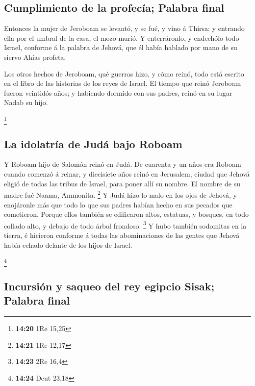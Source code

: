 \hypertarget{cumplimiento-de-la-profecuxeda-palabra-final}{%
\subsection{Cumplimiento de la profecía; Palabra
final}\label{cumplimiento-de-la-profecuxeda-palabra-final}}

 Entonces la mujer de Jeroboam se levantó, y se fué, y vino
á Thirsa: y entrando ella por el umbral de la casa, el mozo murió.
 Y enterráronlo, y endechólo todo Israel, conforme á la
palabra de Jehová, que él había hablado por mano de su siervo Ahías
profeta.

 Los otros hechos de Jeroboam, qué guerras hizo, y cómo
reinó, todo está escrito en el libro de las historias de los reyes de
Israel.  El tiempo que reinó Jeroboam fueron veintidós
años; y habiendo dormido con sus padres, reinó en su lugar Nadab su
hijo.

\footnote{\textbf{14:20} 1Re 15,25}

\hypertarget{la-idolatruxeda-de-juduxe1-bajo-roboam}{%
\subsection{La idolatría de Judá bajo
Roboam}\label{la-idolatruxeda-de-juduxe1-bajo-roboam}}

 Y Roboam hijo de Salomón reinó en Judá. De cuarenta y un
años era Roboam cuando comenzó á reinar, y diecisiete años reinó en
Jerusalem, ciudad que Jehová eligió de todas las tribus de Israel, para
poner allí su nombre. El nombre de su madre fué Naama, Ammonita.
\footnote{\textbf{14:21} 1Re 12,17}  Y Judá hizo lo malo en
los ojos de Jehová, y enojáronle más que todo lo que sus padres habían
hecho en sus pecados que cometieron.  Porque ellos también
se edificaron altos, estatuas, y bosques, en todo collado alto, y debajo
de todo árbol frondoso: \footnote{\textbf{14:23} 2Re 16,4} 
Y hubo también sodomitas en la tierra, é hicieron conforme á todas las
abominaciones de las gentes que Jehová había echado delante de los hijos
de Israel.

\footnote{\textbf{14:24} Deut 23,18}

\hypertarget{incursiuxf3n-y-saqueo-del-rey-egipcio-sisak-palabra-final}{%
\subsection{Incursión y saqueo del rey egipcio Sisak; Palabra
final}\label{incursiuxf3n-y-saqueo-del-rey-egipcio-sisak-palabra-final}}

